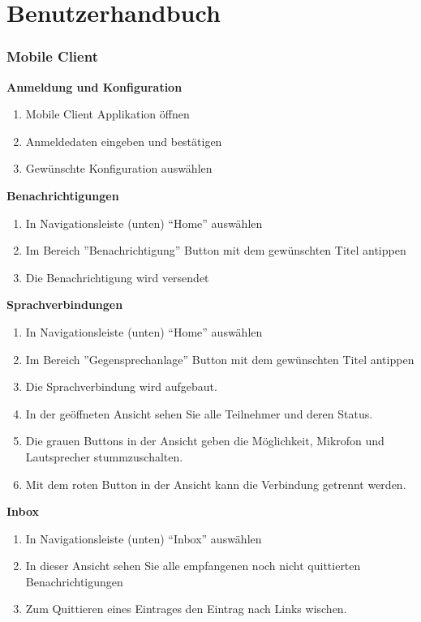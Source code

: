 \section{Benutzerhandbuch}

\subsubsection*{Mobile Client}

\textbf{Anmeldung und Konfiguration}

\begin{enumerate}
    \item Mobile Client Applikation öffnen
    \item Anmeldedaten eingeben und bestätigen
    \item Gewünschte Konfiguration auswählen
\end{enumerate}

\textbf{Benachrichtigungen}

\begin{enumerate}
    \item In Navigationsleiste (unten) ``Home'' auswählen
    \item Im Bereich ''Benachrichtigung'' Button mit dem gewünschten Titel antippen
    \item Die Benachrichtigung wird versendet
\end{enumerate}

\textbf{Sprachverbindungen}

\begin{enumerate}
    \item In Navigationsleiste (unten) ``Home'' auswählen
    \item Im Bereich ''Gegensprechanlage'' Button mit dem gewünschten Titel antippen
    \item Die Sprachverbindung wird aufgebaut.
    \item In der geöffneten Ansicht sehen Sie alle Teilnehmer und deren Status.
    \item Die grauen Buttons in der Ansicht geben die Möglichkeit, Mikrofon und Lautsprecher stummzuschalten.
    \item Mit dem roten Button in der Ansicht kann die Verbindung getrennt werden.
\end{enumerate}

\textbf{Inbox}

\begin{enumerate}
    \item In Navigationsleiste (unten) ``Inbox'' auswählen
    \item In dieser Ansicht sehen Sie alle empfangenen noch nicht quittierten Benachrichtigungen
    \item Zum Quittieren eines Eintrages den Eintrag nach Links wischen.
\end{enumerate}

